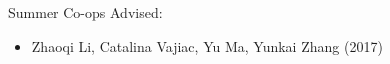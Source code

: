 \vspace{-0.3in}

Summer Co-ops Advised:
\begin{itemize}
 \itemsep 0pt
	\item Zhaoqi Li, Catalina Vajiac, Yu Ma, Yunkai Zhang (2017)
\end{itemize}

